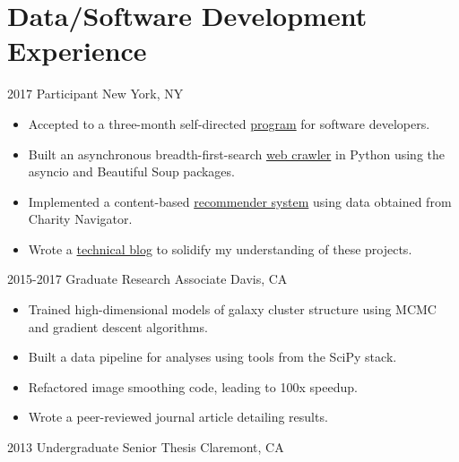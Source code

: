 \documentclass[]{cv-style}          %
\begin{document}


\section{Data/Software Development Experience}

\begin{entrylist}

\entry
  {2017}
  {Participant}
  {New York, NY}
  { 
  \begin{itemize}
    \item Accepted to a three-month self-directed \href{https://www.recurse.com/}{program} for software developers.
    \item Built an asynchronous breadth-first-search \href{https://github.com/eqfinney/web-scraping}{web crawler} in Python using the asyncio and Beautiful Soup packages.
    \item Implemented a content-based \href{https://github.com/eqfinney/recommender-system}{recommender system} using data obtained from Charity Navigator.
    \item Wrote a \href{https://eqfdatadiary.com/}{technical blog} to solidify my understanding of these projects.\\
  \end{itemize}}
\entry
  {2015-2017}
  {Graduate Research Associate}
  {Davis, CA}
  { 
  \begin{itemize}
    \item Trained high-dimensional models of galaxy cluster structure using MCMC and gradient descent algorithms. 
    \item Built a data pipeline for analyses using tools from the SciPy stack. 
    \item Refactored image smoothing code, leading to 100x speedup.
    \item Wrote a peer-reviewed journal article detailing results.\\
  \end{itemize}}
\entry
  {2013}
  {Undergraduate Senior Thesis}
  {Claremont, CA}
  { 
  \begin{itemize}

\end{itemize}}
\end{entrylist}
\end{document}
